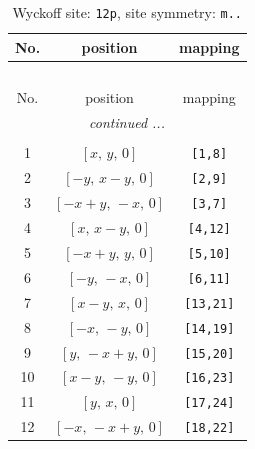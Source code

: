 \documentclass[fleqn,8pt]{jsarticle}
\begin{document}
\begin{longtable}{ccc}
\caption{Wyckoff site: {\tt 12p}, site symmetry: {\tt m..}}
 \\
 \hline \hline
No. & position & mapping \\ \hline \endfirsthead

\multicolumn{2}{l}{\tablename\ \thetable{}} \\
 \hline \hline
No. & position & mapping \\ \hline \endhead

 \hline \hline
\multicolumn{2}{r}{\footnotesize\it continued ...} \\ \endfoot

 \hline \hline
\multicolumn{2}{r}{} \\ \endlastfoot

1 & $\left[ x,\, y,\, 0 \right]$ & {\tt [1,8]} \\ \hline
2 & $\left[ - y,\, x - y,\, 0 \right]$ & {\tt [2,9]} \\ \hline
3 & $\left[ - x + y,\, - x,\, 0 \right]$ & {\tt [3,7]} \\ \hline
4 & $\left[ x,\, x - y,\, 0 \right]$ & {\tt [4,12]} \\ \hline
5 & $\left[ - x + y,\, y,\, 0 \right]$ & {\tt [5,10]} \\ \hline
6 & $\left[ - y,\, - x,\, 0 \right]$ & {\tt [6,11]} \\ \hline
7 & $\left[ x - y,\, x,\, 0 \right]$ & {\tt [13,21]} \\ \hline
8 & $\left[ - x,\, - y,\, 0 \right]$ & {\tt [14,19]} \\ \hline
9 & $\left[ y,\, - x + y,\, 0 \right]$ & {\tt [15,20]} \\ \hline
10 & $\left[ x - y,\, - y,\, 0 \right]$ & {\tt [16,23]} \\ \hline
11 & $\left[ y,\, x,\, 0 \right]$ & {\tt [17,24]} \\ \hline
12 & $\left[ - x,\, - x + y,\, 0 \right]$ & {\tt [18,22]} \\
\end{longtable}
\renewcommand{\arraystretch}{1.2}
\end{document}
